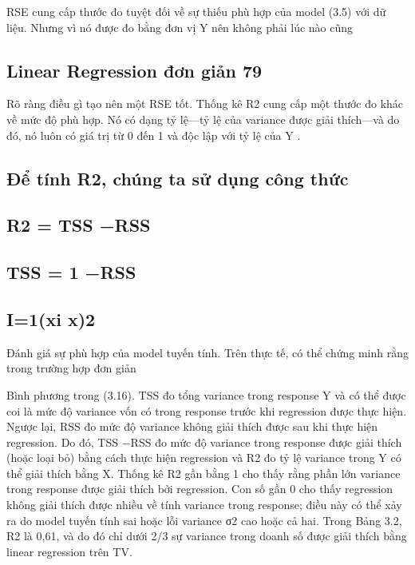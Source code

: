 RSE cung cấp thước đo tuyệt đối về sự thiếu phù hợp của model (3.5) với dữ liệu. Nhưng vì nó được đo bằng đơn vị Y nên không phải lúc nào cũng

\subsection{Linear Regression đơn giản 79}

Rõ ràng điều gì tạo nên một RSE tốt. Thống kê R2 cung cấp một thước đo khác về mức độ phù hợp. Nó có dạng tỷ lệ—tỷ lệ của variance được giải thích—và do đó, nó luôn có giá trị từ 0 đến 1 và độc lập với tỷ lệ của Y .

\subsection{Để tính R2, chúng ta sử dụng công thức}

\subsection{R2 = TSS −RSS}

\subsection{TSS = 1 −RSS}

\subsection{I=1(xi   x)2}

Đánh giá sự phù hợp của model tuyến tính. Trên thực tế, có thể chứng minh rằng trong trường hợp đơn giản

Bình phương trong (3.16). TSS đo tổng variance trong response Y và có thể được coi là mức độ variance vốn có trong response trước khi regression được thực hiện. Ngược lại, RSS đo mức độ variance không giải thích được sau khi thực hiện regression. Do đó, TSS −RSS đo mức độ variance trong response được giải thích (hoặc loại bỏ) bằng cách thực hiện regression và R2 đo tỷ lệ variance trong Y có thể giải thích bằng X. Thống kê R2 gần bằng 1 cho thấy rằng phần lớn variance trong response được giải thích bởi regression. Con số gần 0 cho thấy regression không giải thích được nhiều về tính variance trong response; điều này có thể xảy ra do model tuyến tính sai hoặc lỗi variance σ2 cao hoặc cả hai. Trong Bảng 3.2, R2 là 0,61, và do đó chỉ dưới 2/3 sự variance trong doanh số được giải thích bằng linear regression trên TV.

